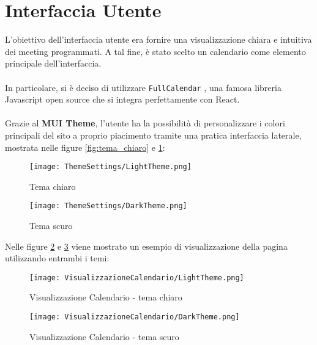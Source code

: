 \section{Interfaccia Utente}
L'obiettivo dell'interfaccia utente era fornire una visualizzazione chiara e intuitiva dei meeting programmati. 
A tal fine, è stato scelto un calendario come elemento principale dell'interfaccia.
\\\\
In particolare, si è deciso di utilizzare \texttt{FullCalendar} \cite{FullCalendarSite},
una famosa libreria Javascript open source che si integra perfettamente con React.
\\\\
Grazie al \textbf{MUI Theme}, l'utente ha la possibilità di personalizzare i colori 
principali del sito a proprio piacimento tramite una pratica interfaccia laterale, mostrata nelle figure
\ref{fig:tema_chiaro} e \ref{fig:tema_scuro}:
\begin{figure}[H]
    \centering
    \begin{minipage}{0.45\textwidth}
        \centering
        \texttt{[image: ThemeSettings/LightTheme.png]}
        \caption{Tema chiaro}
        \label{fig:tema_chiaro}
    \end{minipage}
    \hspace{0.05\textwidth}
    \begin{minipage}{0.45\textwidth}
        \centering
        \texttt{[image: ThemeSettings/DarkTheme.png]}
        \caption{Tema scuro}
        \label{fig:tema_scuro}
    \end{minipage}
\end{figure}
\clearpage
\noindent Nelle figure \ref{fig:visualizzazioneCalendario} e \ref{fig:visualizzazioneCalendario_scuro} 
viene mostrato un esempio di visualizzazione della pagina utilizzando entrambi i temi:
\begin{figure}[H]   
    \centering
    \texttt{[image: VisualizzazioneCalendario/LightTheme.png]}
    \caption{Visualizzazione Calendario - tema chiaro}
    \label{fig:visualizzazioneCalendario}
\end{figure}
\begin{figure}[H]
    \centering
    \texttt{[image: VisualizzazioneCalendario/DarkTheme.png]}
    \caption{Visualizzazione Calendario - tema scuro}
    \label{fig:visualizzazioneCalendario_scuro}
\end{figure}
